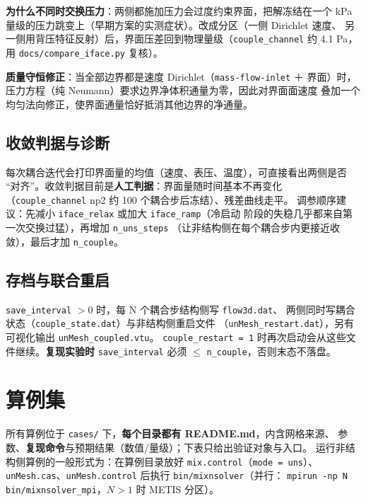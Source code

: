 \documentclass[11pt,a4paper]{ctexart}
\begin{document}
\textbf{为什么不同时交换压力}：两侧都施加压力会过度约束界面，把解冻结在一个
kPa 量级的压力跳变上（早期方案的实测症状）。改成分区（一侧 Dirichlet 速度、
另一侧用背压特征反射）后，界面压差回到物理量级（\texttt{couple\_channel}
约 4.1 Pa，用 \texttt{docs/compare\_iface.py} 复核）。

\textbf{质量守恒修正}：当全部边界都是速度 Dirichlet（\texttt{mass-flow-inlet}
＋ 界面）时，压力方程（纯 Neumann）要求边界净体积通量为零，因此对界面面速度
叠加一个均匀法向修正，使界面通量恰好抵消其他边界的净通量。

\subsection{收敛判据与诊断}

每次耦合迭代会打印界面量的均值（速度、表压、温度），可直接看出两侧是否
``对齐''。收敛判据目前是\textbf{人工判据}：界面量随时间基本不再变化
（\texttt{couple\_channel} np2 约 100 个耦合步后冻结）、残差曲线走平。
调参顺序建议：先减小 \texttt{iface\_relax} 或加大 \texttt{iface\_ramp}（冷启动
阶段的失稳几乎都来自第一次交换过猛），再增加 \texttt{n\_uns\_steps}
（让非结构侧在每个耦合步内更接近收敛），最后才加 \texttt{n\_couple}。

\subsection{存档与联合重启}

\texttt{save\_interval} $>0$ 时，每 N 个耦合步结构侧写 \texttt{flow3d.dat}、
两侧同时写耦合状态（\texttt{couple\_state.dat}）与非结构侧重启文件
（\texttt{unMesh\_restart.dat}），另有可视化输出 \texttt{unMesh\_coupled.vtu}。
\texttt{couple\_restart = 1} 时再次启动会从这些文件继续。\textbf{复现实验时}
\texttt{save\_interval} 必须 $\le$ \texttt{n\_couple}，否则末态不落盘。

\section{算例集}\label{sec:cases}

所有算例位于 \texttt{cases/} 下，\textbf{每个目录都有 README.md}，内含网格来源、
参数、\textbf{复现命令}与预期结果（数值/量级）；下表只给出验证对象与入口。
运行非结构侧算例的一般形式为：在算例目录放好 \texttt{mix.control}（\texttt{mode = uns}）、
\texttt{unMesh.cas}、\texttt{unMesh.control} 后执行 \texttt{bin/mixnsolver}（并行：
\texttt{mpirun -np N bin/mixnsolver\_mpi}，$N>1$ 时 METIS 分区）。
\end{document}
